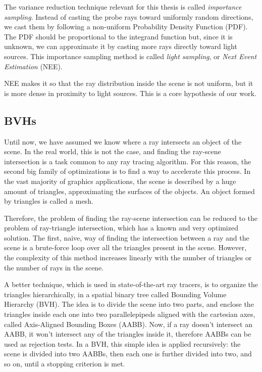 \documentclass[11pt,a4paper,twocolumn]{article}
\begin{document}
The variance reduction technique relevant for this thesis is called \textit{importance sampling}. Instead of casting the probe rays toward uniformly random directions, we cast them by following a non-uniform Probability Density Function (PDF). The PDF should be proportional to the integrand function but, since it is unknown, we can approximate it by casting more rays directly toward light sources. This importance sampling method is called \textit{light sampling}, or \textit{Next Event Estimation} (NEE).

NEE makes it so that the ray distribution inside the scene is not uniform, but it is more dense in proximity to light sources. This is a core hypothesis of our work.

\subsection{BVHs}
Until now, we have assumed we know where a ray intersects an object of the scene. In the real world, this is not the case, and finding the ray-scene intersection is a task common to any ray tracing algorithm. For this reason, the second big family of optimizations is to find a way to accelerate this process. In the vast majority of graphics applications, the scene is described by a huge amount of triangles, approximating the surfaces of the objects. An object formed by triangles is called a mesh.

Therefore, the problem of finding the ray-scene intersection can be reduced to the problem of ray-triangle intersection, which has a known and very optimized solution. The first, naive, way of finding the intersection between a ray and the scene is a brute-force loop over all the triangles present in the scene. However, the complexity of this method increases linearly with the number of triangles or the number of rays in the scene. 

A better technique, which is used in state-of-the-art ray tracers, is to organize the triangles hierarchically, in a spatial binary tree called Bounding Volume Hierarchy (BVH). The idea is to divide the scene into two parts, and enclose the triangles inside each one into two parallelepipeds aligned with the cartesian axes, called Axis-Aligned Bounding Boxes (AABB). Now, if a ray doesn't intersect an AABB, it won't intersect any of the triangles inside it, therefore AABBs can be used as rejection tests. In a BVH, this simple idea is applied recursively: the scene is divided into two AABBs, then each one is further divided into two, and so on, until a stopping criterion is met. 
\end{document}
